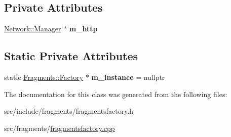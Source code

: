 \subsection*{Private Attributes}
\begin{DoxyCompactItemize}
\item 
\mbox{\label{classFragments_1_1Factory_aa98b2097fdc55511bdf4fc3bda37e98e}} 
\mbox{\hyperlink{classNetwork_1_1Manager}{Network\+::\+Manager}} $\ast$ {\bfseries m\+\_\+http}
\end{DoxyCompactItemize}
\subsection*{Static Private Attributes}
\begin{DoxyCompactItemize}
\item 
\mbox{\label{classFragments_1_1Factory_a7e07aaa093813ab0e1cb50e92ac1386e}} 
static \mbox{\hyperlink{classFragments_1_1Factory}{Fragments\+::\+Factory}} $\ast$ {\bfseries m\+\_\+instance} = nullptr
\end{DoxyCompactItemize}


The documentation for this class was generated from the following files\+:\begin{DoxyCompactItemize}
\item 
src/include/fragments/fragmentsfactory.\+h\item 
src/fragments/\mbox{\hyperlink{fragmentsfactory_8cpp}{fragmentsfactory.\+cpp}}\end{DoxyCompactItemize}
